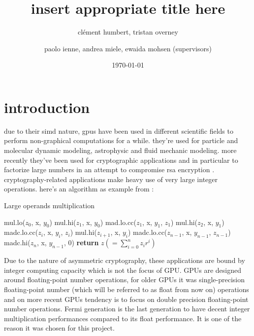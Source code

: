 \documentclass{report}
\begin{document}
\title{insert appropriate title here}
\author{cl\'{e}ment humbert, tristan overney\and paolo ienne, andrea miele, ewaida mohsen (supervisors)}
\date{\today}
\maketitle

\nocite{*}

\setcounter{tocdepth}{1}
\tableofcontents
\listoffigures

\chapter{introduction}

    due to their simd nature, gpus have been used in different scientific fields to perform
    non-graphical computations for a while. they're used for particle and molecular dynamic 
    modeling, astrophysic and fluid mechanic modeling.
    more recently they've been used for cryptographic applications and in particular
    to factorize large numbers in an attempt to compromise rsa encryption \cite{cofact14}.
    cryptography-related applications make heavy use of very large integer operations.
    here's an algorithm as example from \cite{cofact14}:
    \begin{algorithm}
    \caption{Large operands multiplication}\label{alg:mulalgo}
    \begin{algorithmic}[1]
        \state mul.lo($z_0$, x, $y_0$)
        \state mul.hi($z_1$, x, $y_0$)
        \state mad.lo.cc($z_1$, x, $y_1$, $z_1$)
        \state mul.hi($z_2$, x, $y_1$)
            \state madc.lo.cc($z_i$, x, $y_i$, $z_i$)
            \state mul.hi($z_{i+1}$, x, $y_i$)
        \endfor
        \state madc.lo.cc($z_{n-1}$, x, $y_{n-1}$, $z_{n-1}$)
        \state madc.hi($z_n$, x, $y_{n-1}$, 0)
        \state \textbf{return} $z (=\sum_{i=0}^nz_ir^i)$
    \end{algorithmic}
    \end{algorithm}

    Due to the nature of asymmetric cryptography, these applications are bound by
    integer computing capacity which is not the focus of GPU. GPUs are designed
    around floating-point number operations, for older GPUs it was single-precision
    floating-point number (which will be referred to as float from now on) operations and
    on more recent GPUs tendency is to focus on double precision floating-point number operations.
    Fermi generation is the last generation to have decent integer multiplication performances
    compared to its float performance. It is one of the reason it was chosen for this project.
\end{document}
